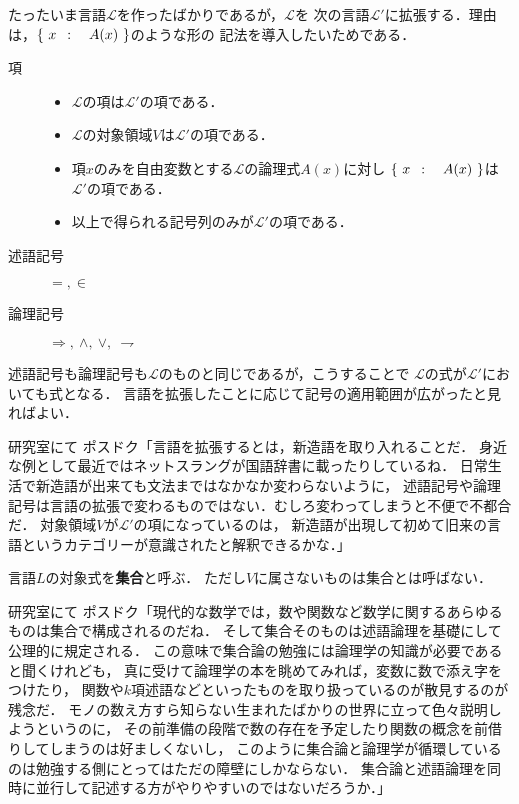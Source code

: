 	たったいま言語$\mathcal{L}$を作ったばかりであるが，$\mathcal{L}$を
	次の言語$\mathcal{L}'$に拡張する．理由は，$\left\{\ x\ \, : \quad A(x)\ \right\}$のような形の
	記法を導入したいためである．
	\begin{description}
		\item[項] 
			\begin{itemize}
				\item $\mathcal{L}$の項は$\mathcal{L}'$の項である．
				\item $\mathcal{L}$の対象領域$V$は$\mathcal{L}'$の項である．
				\item 項$x$のみを自由変数とする$\mathcal{L}$の論理式$A(x)$に対し
					$\left\{\ x\ \, : \quad A(x)\ \right\}$は$\mathcal{L}'$の項である．
				\item 以上で得られる記号列のみが$\mathcal{L}'$の項である．
			\end{itemize}
			
		\item[述語記号] $=,\in$
		\item[論理記号] $\Longrightarrow,\ \wedge,\ \vee,\ \rightharpoondown$
	\end{description}
	
	述語記号も論理記号も$\mathcal{L}$のものと同じであるが，こうすることで
	$\mathcal{L}$の式が$\mathcal{L}'$においても式となる．
	言語を拡張したことに応じて記号の適用範囲が広がったと見ればよい．
	
	\begin{itembox}[l]{研究室にて}
		ポスドク「言語を拡張するとは，新造語を取り入れることだ．
			身近な例として最近ではネットスラングが国語辞書に載ったりしているね．
			日常生活で新造語が出来ても文法まではなかなか変わらないように，
			述語記号や論理記号は言語の拡張で変わるものではない．むしろ変わってしまうと不便で不都合だ．
			対象領域$V$が$\mathcal{L}'$の項になっているのは，
			新造語が出現して初めて旧来の言語というカテゴリーが意識されたと解釈できるかな．」
	\end{itembox}
	
	\begin{screen}
		\begin{dfn}[集合]
			言語$L$の対象式を{\bf 集合}と呼ぶ．
			ただし$V$に属さないものは集合とは呼ばない．
		\end{dfn}
	\end{screen}
	
	\begin{itembox}[l]{研究室にて}
		ポスドク「現代的な数学では，数や関数など数学に関するあらゆるものは集合で構成されるのだね．
		そして集合そのものは述語論理を基礎にして公理的に規定される．
		この意味で集合論の勉強には論理学の知識が必要であると聞くけれども，
		真に受けて論理学の本を眺めてみれば，変数に数で添え字をつけたり，
		関数や$k$項述語などといったものを取り扱っているのが散見するのが残念だ．
		モノの数え方すら知らない生まれたばかりの世界に立って色々説明しようというのに，
		その前準備の段階で数の存在を予定したり関数の概念を前借りしてしまうのは好ましくないし，
		このように集合論と論理学が循環しているのは勉強する側にとってはただの障壁にしかならない．
		集合論と述語論理を同時に並行して記述する方がやりやすいのではないだろうか．」
	\end{itembox}
	
